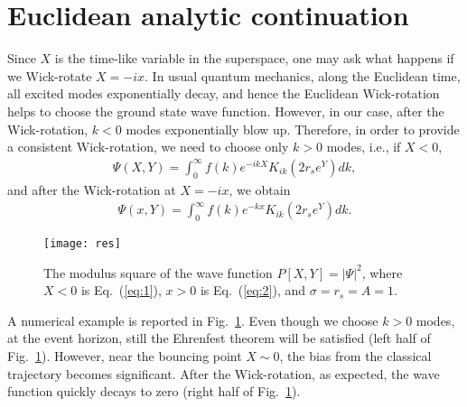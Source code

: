 \documentclass{andromedaone}
\begin{document}
\section{Euclidean analytic continuation}

Since $X$ is the time-like variable in the superspace, one may ask what happens if we Wick-rotate $X = -ix$. In usual quantum mechanics, along the Euclidean time, all excited modes exponentially decay, and hence the Euclidean Wick-rotation helps to choose the ground state wave function. However, in our case, after the Wick-rotation, $k < 0$ modes exponentially blow up. Therefore, in order to provide a consistent Wick-rotation, we need to choose only $k > 0$ modes, i.e., if $X < 0$,
\begin{eqnarray}
\Psi(X,Y) = \int_{0}^{\infty} f(k) e^{-ikX} K_{ik}\left(2r_{s} e^{Y}\right) dk, \label{eq:1}
\end{eqnarray}
and after the Wick-rotation at $X = -ix$, we obtain
\begin{eqnarray}
\Psi(x,Y) = \int_{0}^{\infty} f(k) e^{-kx} K_{ik}\left(2r_{s} e^{Y}\right) dk. \label{eq:2}
\end{eqnarray}

\begin{figure}
\begin{center}
\texttt{[image: res]}
\caption{\label{fig:res}The modulus square of the wave function $P[X,Y] = |\Psi|^{2}$, where $X < 0$ is Eq.~(\ref{eq:1}), $x > 0$ is Eq.~(\ref{eq:2}), and $\sigma = r_{s} = A = 1$.}
\end{center}
\end{figure}

A numerical example is reported in Fig.~\ref{fig:res}. Even though we choose $k > 0$ modes, at the event horizon, still the Ehrenfest theorem will be satisfied (left half of Fig.~\ref{fig:res}). However, near the bouncing point $X \sim 0$, the bias from the classical trajectory becomes significant. After the Wick-rotation, as expected, the wave function quickly decays to zero (right half of Fig.~\ref{fig:res}).
\end{document}
